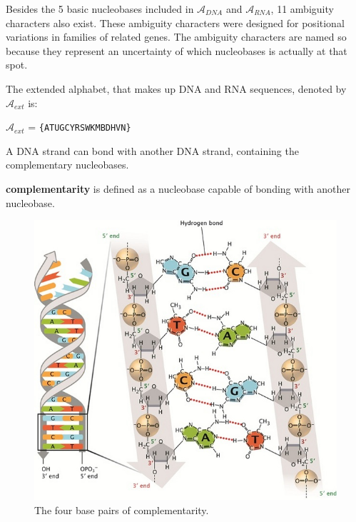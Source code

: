 \documentclass[12pt]{article}
\theoremstyle{definition}
\begin{document}
Besides the 5 basic nucleobases included in $\mathcal{A}_{DNA}$ and $\mathcal{A}_{RNA}$, 11 ambiguity characters also exist.\cite{DNA-sciencedaily} These ambiguity characters were designed for positional variations in families of related genes. The ambiguity characters are named so because they represent  an uncertainty of which nucleobases is actually at that spot.

\begin{definition}
The extended alphabet, that makes up DNA and RNA sequences, denoted by $\mathcal{A}_{ext}$ is:
\begin{center}
$\mathcal{A}_{ext}$ = \texttt{\{ATUGCYRSWKMBDHVN\}}
\end{center}
\end{definition}

A DNA strand can bond with another DNA strand, containing the complementary nucleobases.

\begin{definition}
\textbf{complementarity} is defined as a nucleobase capable of bonding with another nucleobase.
\end{definition}

\begin{figure}[H]
	\label{Complementarity}
	\begin{center}
		\includegraphics[scale=2.5]{complementarity.jpg}	
	\end{center}
	\caption{The four base pairs of complementarity.\cite{DNA-nature}}
\end{figure}
\end{document}
